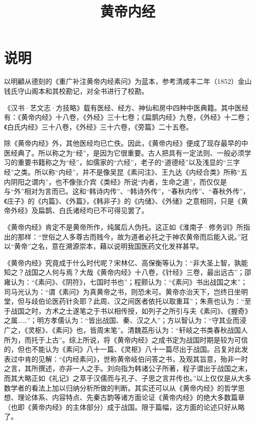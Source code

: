 \documentclass[12pt,UTF8]{ctexbook}
\title{\heiti\zihao{0} 黄帝内经}
\date{}
\begin{document}
\maketitle

\tableofcontents

\frontmatter

\chapter{说明}
以明顧从德刻的《重广补注黄帝内经素问》为蓝本，参考清咸丰二年（1852）金山钱氏守山阁本和其校勘记，对全书进行了校勘。

《汉书·艺文志·方技略》载有医经、经方、神仙和房中四种中医典籍。其中医经有：《黄帝内经》十八卷，《外经》三十七卷；《扁鹊内经》九卷，《外经》十二卷；《白氏内经》三十八卷，《外经》三十六卷，《旁篇》二十五卷。

除《黄帝内经》外，其他医经均已亡佚。因此，《黄帝内经》便成了现存最早的中医经典了。所以称之为“经”，是因为它很重要。古人把具有一定法则、一般必须学习的重要书籍称之为“经”，如儒家的“六经”，老子的“道德经”以及浅显的“三字经”之类。所以称“内经”，并不是像吴昆《素问注》、王九达《内经合类》所称“五内阴阳之谓内”，也不像张介宾《类经》所说“内者，生命之道”，而仅仅是与“外”相对为言而已。这和“韩诗内传”、“韩诗外传”，“春秋内传”、“春秋外传”，《庄子》的《内篇》、《外篇》，《韩非子》的《内储》、《外储》之意相同，只是《黄帝外经》及扁鹊、白氏诸经均已不可得见罢了。

《黄帝内经》肯定不是黄帝所作，纯属后人伪托。这正如《淮南子·修务训》所指出的那样：“世俗之人多尊古而贱今，故为道者必托之于神农黄帝而后能入说。”冠以“黄帝”之名，意在溯源崇本，藉以说明我国医药文化发祥甚早。

《黄帝内经》究竟成于什么时代呢？宋林亿、高保衡等认为：“非大圣上智，孰能知之？战国之人何与焉？大哉《黄帝内经》十八卷，《针经》三卷，最出远古”；邵雍认为：“《素问》、《阴符》，七国时书也”；程颢认为：“《素问》书出战国之末”；司马光认为：“谓《素问》为真黄帝之书，则恐未可。黄帝亦治天下，岂终日坐明堂，但与歧伯论医药针灸耶？此周、汉之间医者依托以取重耳”；朱熹也认为：“至于战国之时，方术之士遂笔之于书以相传授，如列子之所引与夫《素问》、《握奇》之属……”；明方孝儒认为：“皆出战国、秦、汉之人”；方以智认为：“守其业而浸广之，《灵枢》、《素问》也，皆周末笔”。清魏荔彤认为：“轩岐之书类春秋战国人所为，而托于上古”。综上所说，将《黄帝内经》之成书定为战国时期是较为可信的，但也不能认为《素问》八十一篇、《灵枢》八十一篇尽出于战国。吕复对此发表过中肯的见解：“《内经素问》，世称黄帝岐伯问答之书，及观其旨意，殆非一时之言，其所撰述，亦非一人之手。刘向指为韩诸公子所著，程子谓出于战国之末，而其大略正如《礼记》之萃于汉儒而与孔子、子思之言并传也。”以上仅仅是从大多数学者的看法上加以归纳分析所做的判断。其实还可以从《黄帝内经》的哲学思想、理论体系、内容特点、先秦古韵等诸方面论证《黄帝内经》的绝大多数篇章（也即《黄帝内经》的主体部分）成于战国。限于篇幅，这方面的论述只好从略了。
\end{document}
